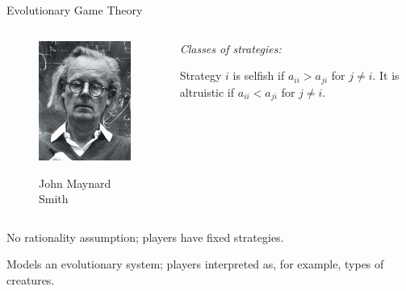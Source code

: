 \documentclass{beamer}
\begin{document}
\begin{frame}[c]{Evolutionary Game Theory}
\begin{columns}[c]
  \begin{column}{0.5\textwidth}
    \begin{figure}
      \includegraphics[height=.45\textheight]{./images/maynardSmith.jpg}

      John Maynard Smith
    \end{figure}
  \end{column}
  \begin{column}{0.5\textwidth}
    \emph{Classes of strategies:}

    Strategy $i$ is selfish if $a_{ii} > a_{ji}$ for $j\neq i$. It is altruistic if $a_{ii} < a_{ji}$ for $j\neq i$.
  \end{column}
\end{columns}
\begin{block}{}
  No rationality assumption; players have fixed strategies.
  
  Models an evolutionary system; players interpreted as, for example, types of creatures.
\end{block}
\end{frame}

\end{document}

